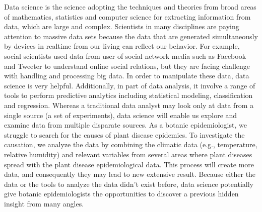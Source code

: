 \documentclass[12pt,a4paper]{article}
\begin{document}





Data science is the science adopting the techniques and theories from broad areas of mathematics, statistics and computer science for extracting information from data, which are large and complex. Scientists in many disciplines are paying attention to massive data sets because the data that are generated simultaneously by devices in realtime from our living can reflect our behavior. For example, social scientists used data from user of social network media such as Facebook and Tweeter to understand online social relations, but they are facing challenge with handling and processing big data. In order to manipulate these data, data science is very helpful. Additionally, in part of data analysis, it involve a range of tools to perform predictive analytics including statistical modeling, classification and regression. Whereas a traditional data analyst may look only at data from a single source (a set of experiments), data science will enable us explore and examine data from multiple disparate sources. As a botanic epidemiologist, we struggle to search for the causes of plant disease epidemics. To investigate the causation, we analyze the data by combining the climatic data (e.g., temperature, relative humidity) and relevant variables from several areas where plant diseases spread with the plant disease epidemiological data. This process will create more data, and consequently they may lead to new extensive result. Because either the data or the tools to analyze the data didn't exist before, data science potentially give botanic epidemiologists the opportunities to discover a previous hidden insight from many angles.
\end{document}
